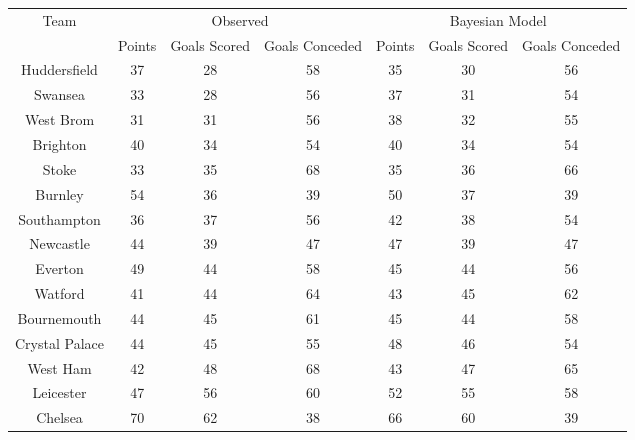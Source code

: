 \documentclass{article}
\begin{document}
\begin{table}[!htb]
\centering
\begin{tabular}{c|ccc|ccc}
\multirow{2}{*}{Team} & \multicolumn{3}{c|}{Observed}          & \multicolumn{3}{c}{Bayesian Model}     \\
                      & Points & Goals Scored & Goals Conceded & Points & Goals Scored & Goals Conceded \\ \hline
Huddersfield          & 37     & 28           & 58             & 35     & 30           & 56             \\
Swansea               & 33     & 28           & 56             & 37     & 31           & 54             \\
West Brom             & 31     & 31           & 56             & 38     & 32           & 55             \\
Brighton              & 40     & 34           & 54             & 40     & 34           & 54             \\
Stoke                 & 33     & 35           & 68             & 35     & 36           & 66             \\
Burnley               & 54     & 36           & 39             & 50     & 37           & 39             \\
Southampton           & 36     & 37           & 56             & 42     & 38           & 54             \\
Newcastle             & 44     & 39           & 47             & 47     & 39           & 47             \\
Everton               & 49     & 44           & 58             & 45     & 44           & 56             \\
Watford               & 41     & 44           & 64             & 43     & 45           & 62             \\
Bournemouth           & 44     & 45           & 61             & 45     & 44           & 58             \\
Crystal Palace        & 44     & 45           & 55             & 48     & 46           & 54             \\
West Ham              & 42     & 48           & 68             & 43     & 47           & 65             \\
Leicester             & 47     & 56           & 60             & 52     & 55           & 58             \\
Chelsea               & 70     & 62           & 38             & 66     & 60           & 39             \\

\end{tabular}
\end{table}
\end{document}
